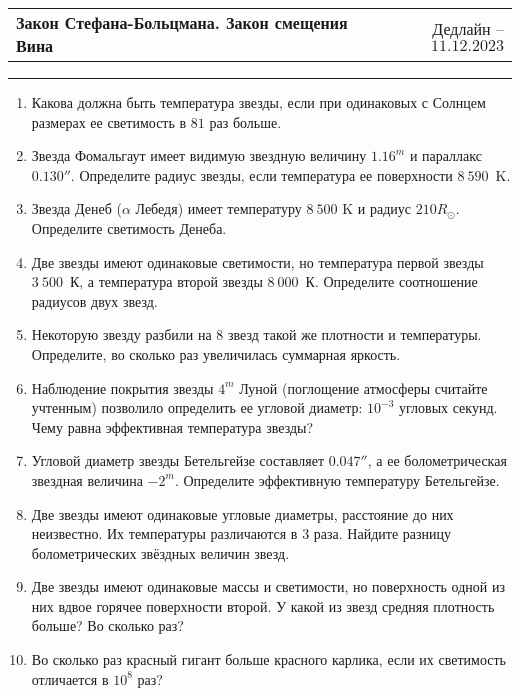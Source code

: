 \documentclass[12pt]{article}
\begin{document}
 \begin{tabularx}{\textwidth}{Xr}
  {\Large \textbf{Закон Стефана-Больцмана. Закон смещения Вина}} & Дедлайн -- $11.12.2023$ \\
 \end{tabularx}
 \noindent\rule{\textwidth}{0.4pt}
 \begin{enumerate}
        \item Какова должна быть температура звезды, если при одинаковых с Солнцем размерах ее светимость в $81$ раз больше.

        \item Звезда Фомальгаут имеет видимую звездную величину $1.16^m$ и параллакс $0.130''$. Определите радиус звезды, если температура ее поверхности $8~590$~K.

        \item Звезда Денеб ($\alpha$ Лебедя) имеет температуру $8~500$ K и радиус $210 R_{\odot}$. Определите светимость Денеба.

        \item Две звезды имеют одинаковые светимости,	но температура первой звезды $3~500$~К, а температура второй звезды $8~000$~К. Определите соотношение радиусов двух звезд.

        \item Некоторую звезду разбили на $8$ звезд такой же плотности и температуры. Определите, во сколько раз увеличилась суммарная яркость.

        \item Наблюдение покрытия звезды $4^m$ Луной (поглощение атмосферы считайте учтенным) позволило определить ее угловой диаметр: $10^{-3}$ угловых секунд. Чему равна эффективная температура звезды?

        \item Угловой диаметр звезды Бетельгейзе составляет $0.047''$, а ее болометрическая звездная величина $-2^m$. Определите эффективную температуру Бетельгейзе.

        \item Две звезды имеют одинаковые угловые диаметры, расстояние до них неизвестно. Их температуры различаются в $3$ раза. Найдите разницу болометрических звёздных величин звезд.

        \item Две звезды имеют одинаковые массы и светимости, но поверхность одной из них вдвое горячее поверхности второй. У какой из звезд средняя плотность больше? Во сколько раз?

        \item Во сколько раз красный гигант больше красного карлика, если их светимость отличается в $10^8$ раз?
 \end{enumerate}
\end{document}
